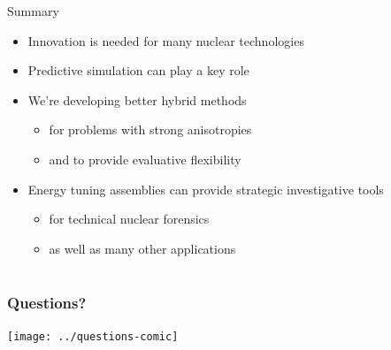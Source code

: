 \documentclass[xcolor=x11names,compress]{beamer}
\renewcommand{\(}{\begin{columns}}
\renewcommand{\)}{\end{columns}}
\newcommand{\<}[1]{\begin{column}{#1}}
\renewcommand{\>}{\end{column}}
\begin{document}
\begin{frame}{Summary}
  \begin{itemize}
    \item Innovation is needed for many nuclear technologies \newline
    \item Predictive simulation can play a key role \newline
    \item We're developing better hybrid methods 
    \begin{itemize}
      \item for problems with strong anisotropies
      \item and to provide evaluative flexibility \newline
    \end{itemize}
    \item Energy tuning assemblies can provide strategic investigative tools
    \begin{itemize}
      \item for technical nuclear forensics
      \item as well as many other applications
    \end{itemize}
      
  \end{itemize}
\end{frame}

\section*{}
\begin{frame}[fragile]
  \frametitle{Questions?}
  \begin{center}
  \texttt{[image: ../questions-comic]}  
  \end{center}
  
\end{frame}
\end{document}
